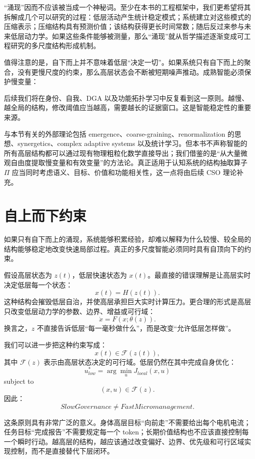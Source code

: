 “涌现”因而不应该被当成一个神秘词。至少在本书的工程框架中，我们更希望将其拆解成几个可以研究的过程：低层活动产生统计稳定模式；系统建立对这些模式的压缩表示；压缩结构具有预测价值；该结构获得更长时间常数；随后反过来参与未来低层动力学。如果这些条件能够被测量，那么“涌现”就从哲学描述逐渐变成可工程研究的多尺度结构形成机制。

值得注意的是，自下而上并不意味着低层“决定一切”。如果系统只有自下而上的聚合，没有更慢尺度的约束，那么高层状态会不断被短期噪声推动。成熟智能必须保护慢变量：
\begin{statementbox}
\centering
{}
\end{statementbox}
后续我们将在身份、自我、DGA 以及功能拓扑学习中反复看到这一原则。越慢、越全局的结构，修改阈值应当越高，需要越长的证据窗口。这是智能稳定性的重要来源。

与本节有关的外部理论包括 emergence、coarse-graining、renormalization 的思想、synergetics、complex adaptive systems 以及统计学习。但本书不声称智能的所有高层结构都可以通过现有物理粗粒化数学直接导出；我们借鉴的是“从大量微观自由度提取慢变量和有效变量”的方法论。真正适用于认知系统的结构抽取算子 $\Pi$ 应当同时考虑语义、目标、价值和功能相关性，这一点将由后续 CSO 理论补充。

\section{自上而下约束}

如果只有自下而上的涌现，系统能够积累经验，却难以解释为什么较慢、较全局的结构能够稳定地改变快速局部过程。真正的多尺度智能必须同时具有自顶向下的约束。

假设高层状态为 $z(t)$，低层快速状态为 $x(t)$。最直接的错误理解是让高层实时决定低层每一个状态：
\[
x(t)=H(z(t)).
\]
这种结构会摧毁低层自治，并使高层承担巨大实时计算压力。更合理的形式是高层只改变低层动力学的参数、边界、增益或可行域：
\[
\dot x
=
F
\left(
x;
\theta(z)
\right).
\]
换言之，$z$ 不直接告诉低层“每一毫秒做什么”，而是改变“允许低层怎样做”。

我们可以进一步把这种约束写成：
\[
x(t)\in\mathcal{F}(z(t)),
\]
其中 $\mathcal{F}(z)$ 表示由高层状态决定的可行域。低层仍然在其中完成自身优化：
\[
u^*_{low}
=
\arg\min_{u}
J_{local}(x,u)
\]
subject to
\[
(x,u)\in\mathcal{F}(z).
\]
因此：
\[
\boxed{
SlowGovernance
\neq
FastMicromanagement.
}
\]

这条原则具有非常广泛的意义。身体高层目标“向前走”不需要给出每个电机电流；任务目标“完成报告”不需要规定每一个 token；长期价值结构也不应该直接控制每一个瞬时行动。越高层的结构，越应该通过改变偏好、边界、优先级和可行区域实现控制，而不是直接替代下层闭环。

